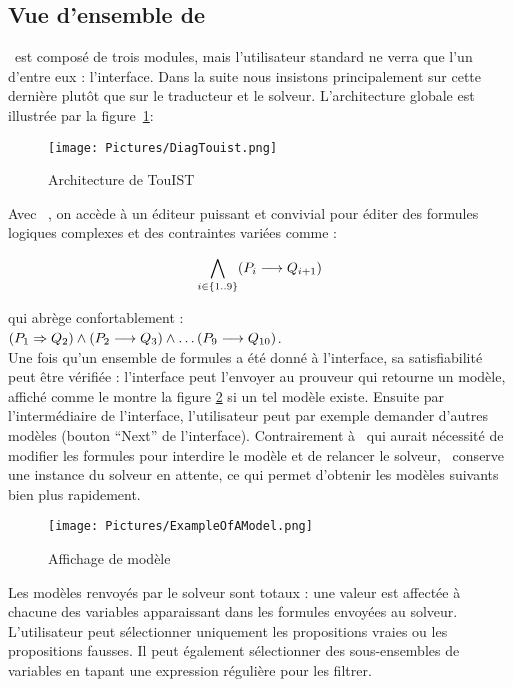 \subsection{Vue d'ensemble de \nameTool}\label{sec:sat_interface}


\nameTool\ est composé de trois modules, mais l'utilisateur standard ne verra que l'un d'entre eux : l'interface. Dans la suite nous insistons principalement sur cette dernière plut\^ot que sur le traducteur et le solveur. L'architecture globale est illustr\'{e}e par la figure~\ref{fig:architectureTouisT}: 

\begin{figure}[htbp]
\centering
\texttt{[image: Pictures/DiagTouist.png]}
  \caption{Architecture de TouIST}
  \label{fig:architectureTouisT}
\end{figure}

Avec \nameTool\ , on accède à un éditeur puissant et convivial pour éditer des formules logiques complexes et des contraintes variées comme :

$$\bigwedge_{i \in \{1..9\}} (P_i \longrightarrow Q_{i+1})$$

qui abrège confortablement :\\ 

$(P_1 \Rightarrow Q_2) \wedge (P_2 \longrightarrow Q_3) \wedge \ldots (P_9\longrightarrow Q_{10})$. 
\\

Une fois qu'un ensemble de formules a été donné à l'interface, sa satisfiabilité peut \^etre vérifiée : l'interface peut l'envoyer au prouveur qui retourne un modèle, affich\'{e} comme le montre la figure \ref{fig:ExampleOfAModel} si un tel mod\`{e}le existe. Ensuite par l'intermédiaire de l'interface, l'utilisateur peut par exemple demander d'autres modèles (bouton ``Next'' de l'interface). Contrairement à \satoulouse\ qui aurait nécessité de modifier les formules pour interdire le modèle et de relancer le solveur, \nameTool\ conserve une instance du solveur en attente, ce qui permet d'obtenir les modèles suivants bien plus rapidement.

\begin{figure}[htbp]
\centering
\texttt{[image: Pictures/ExampleOfAModel.png]}
  \caption{Affichage de mod\`{e}le}
  \label{fig:ExampleOfAModel}
\end{figure}

Les mod\`{e}les renvoy\'{e}s par le solveur sont totaux : une valeur est affect\'{e}e \`{a} chacune des variables apparaissant dans les formules envoy\'{e}es au solveur. L'utilisateur peut s\'{e}lectionner uniquement les propositions vraies ou les propositions fausses. Il peut \'{e}galement s\'{e}lectionner des sous-ensembles de variables en tapant une expression r\'{e}guli\`{e}re pour les filtrer.
